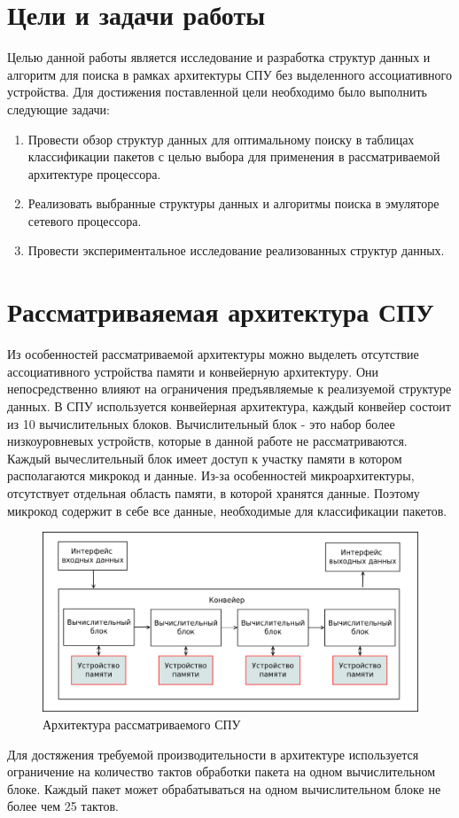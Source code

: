 \documentclass[a4peper, 12pt, titlepage, finall]{report}
\begin{document}
    \chapter{Цели и задачи работы}
        Целью данной работы является исследование и разработка структур данных и алгоритм для поиска в
        рамках архитектуры СПУ без выделенного ассоциативного устройства.
        Для достижения поставленной цели необходимо было выполнить следующие задачи:
        \begin{enumerate}
            \item Провести обзор структур данных для оптимальному поиску в таблицах классификации пакетов с целью выбора для применения в рассматриваемой архитектуре процессора.
            \item Реализовать выбранные структуры данных и алгоритмы поиска в эмуляторе сетевого процессора.
            \item Провести экспериментальное исследование реализованных структур данных.
        \end{enumerate}
       
    \chapter{Рассматриваяемая архитектура СПУ}
        Из особенностей рассматриваемой архитектуры можно выделеть отсутствие ассоциативного устройства памяти и конвейерную архитектуру. 
        Они непосредственно влияют на ограничения предъявляемые к реализуемой структуре данных. В СПУ используется конвейерная 
        архитектура, каждый конвейер состоит из 10 вычислительных блоков. Вычислительный блок - это набор более низкоуровневых устройств,
        которые в данной работе не рассматриваются. Каждый вычеслительный блок имеет доступ к участку памяти в котором располагаются микрокод и данные.
        Из-за особенностей микроархитектуры, отсутствует отдельная область памяти, в которой хранятся данные. Поэтому микрокод содержит в себе все данные,
        необходимые для классификации пакетов.
        \begin{figure}[h]
            \includegraphics[width=\textwidth]{npu_all.png}
            \caption{Архитектура рассматриваемого СПУ}
        \end{figure}
        Для достяжения требуемой производительности в архитектуре используется ограничение на количество тактов обработки пакета
        на одном вычислительном блоке. Каждый пакет может обрабатываться на одном вычислительном блоке не более чем 25 тактов.
        
\end{document}
